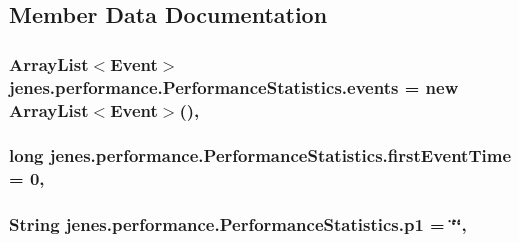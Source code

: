 \subsection{Member Data Documentation}
\hypertarget{classjenes_1_1performance_1_1_performance_statistics_a308183eed76478b3b657d4a88bb7abbc}{
\subsubsection[{events}]{\setlength{\rightskip}{0pt plus 5cm}Array\-List$<${\bf Event}$>$ jenes.\-performance.\-Performance\-Statistics.\-events = new Array\-List$<${\bf Event}$>$()\hspace{0.3cm}{\ttfamily [static]}, {\ttfamily [private]}}}\label{classjenes_1_1performance_1_1_performance_statistics_a308183eed76478b3b657d4a88bb7abbc}
\hypertarget{classjenes_1_1performance_1_1_performance_statistics_a64197b8bd7107ef2b36a491f4f327593}{
\subsubsection[{first\-Event\-Time}]{\setlength{\rightskip}{0pt plus 5cm}long jenes.\-performance.\-Performance\-Statistics.\-first\-Event\-Time = 0\hspace{0.3cm}{\ttfamily [static]}, {\ttfamily [private]}}}\label{classjenes_1_1performance_1_1_performance_statistics_a64197b8bd7107ef2b36a491f4f327593}
\hypertarget{classjenes_1_1performance_1_1_performance_statistics_a99364fccbfa5da2f1574880af60585e0}{
\subsubsection[{p1}]{\setlength{\rightskip}{0pt plus 5cm}String jenes.\-performance.\-Performance\-Statistics.\-p1 = \char`\"{}\char`\"{}\hspace{0.3cm}{\ttfamily [static]}, {\ttfamily [private]}}}\label{classjenes_1_1performance_1_1_performance_statistics_a99364fccbfa5da2f1574880af60585e0}
